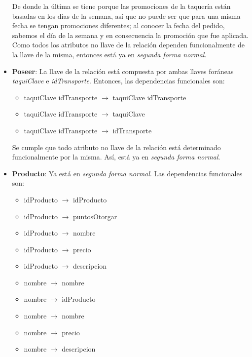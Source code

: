 \documentclass[11pt,letterpaper]{article}
\begin{document}
\begin{itemize}
De donde la última se tiene porque las promociones de la taquería están basadas en los días de la semana, así que no puede ser que para una misma fecha se tengan promociones diferentes; al conocer la fecha del pedido, sabemos el día de la semana y en consecuencia la promoción que fue aplicada.\\

Como todos los atributos no llave de la relación dependen funcionalmente de la llave de la misma, entonces está ya en \textit{segunda forma normal}.
\item \textbf{Poseer}: La llave de la relación está compuesta por ambas llaves foráneas \textit{taquiClave} e \textit{idTransporte}. Entonces, las dependencias funcionales son:

\begin{itemize}
\item taquiClave idTransporte $\rightarrow$ taquiClave idTransporte

\item taquiClave idTransporte $\rightarrow$ taquiClave
\item taquiClave idTransporte $\rightarrow$ idTransporte
\end{itemize}

Se cumple que todo atributo no llave de la relación está determinado funcionalmente por la misma. Así, está ya en \textit{segunda forma normal}.

\item \textbf{Producto}: Ya está en \textit{segunda forma normal}. Las dependencias funcionales son:

\begin{itemize}
\item idProducto $\rightarrow$ idProducto

\item idProducto $\rightarrow$ puntosOtorgar
\item idProducto $\rightarrow$ nombre
\item idProducto $\rightarrow$ precio
\item idProducto $\rightarrow$ descripcion
\item nombre $\rightarrow$ nombre

\item nombre $\rightarrow$ idProducto
\item nombre $\rightarrow$ nombre
\item nombre $\rightarrow$ precio
\item nombre $\rightarrow$ descripcion


\end{itemize}
\end{itemize}
\end{document}
